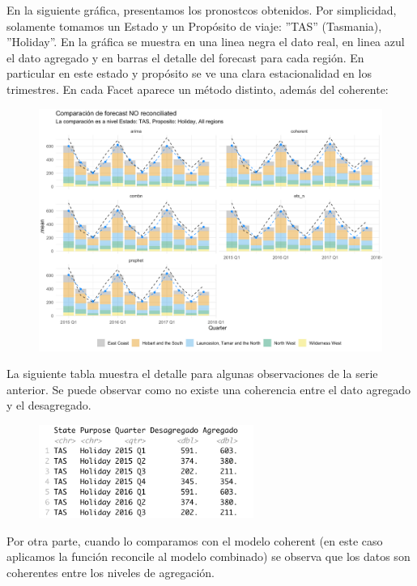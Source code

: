 En la siguiente gráfica, presentamos los pronostcos obtenidos. Por simplicidad, solamente tomamos un Estado y un Propósito de viaje: ''TAS'' (Tasmania), ''Holiday''. En la gráfica se muestra en una linea negra el dato real, en linea azul el dato agregado y en barras el detalle del forecast para cada región. En particular en este estado y propósito se ve una clara estacionalidad en los trimestres. En cada Facet aparece un método distinto, además del coherente:

\begin{figure}[!h]
\centering
      \includegraphics[width=120mm]{imgs/17_no_reconciled_forecast.png}
      \label{fig:snowyplot}
    \end{figure}

\newpage 

La siguiente tabla muestra el detalle para algunas observaciones de la serie anterior. Se puede observar como no existe una coherencia entre el dato agregado y el desagregado.

\begin{figure}[!h]
\centering
      \includegraphics[width=70mm]{imgs/19_no_reconciled_rtable.png}
      \label{fig:snowyplot}
    \end{figure}

Por otra parte, cuando lo comparamos con el modelo coherent (en este caso aplicamos la función reconcile al modelo combinado) se observa que los datos son coherentes entre los niveles de agregación.

